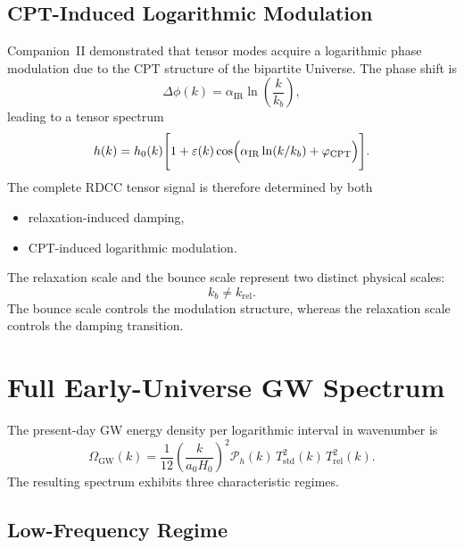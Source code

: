 \documentclass[11pt,a4paper]{article}
\begin{document}
\subsection{CPT-Induced Logarithmic Modulation}

Companion~II demonstrated that tensor modes acquire a logarithmic phase
modulation due to the CPT structure of the bipartite Universe. The phase
shift is
\begin{equation}
  \Delta\phi(k)
  =
  \alpha_{\mathrm{IR}}
  \ln
  \left(
    \frac{k}{k_{b}}
  \right),
\end{equation}
leading to a tensor spectrum
\begin{equation}
  h(k)
  =
  h_{0}(k)
  \Biggl[
    1
    +
    \varepsilon(k)
    \cos
    \Bigl(
      \alpha_{\mathrm{IR}}
      \ln(k/k_{b})
      +
      \varphi_{\mathrm{CPT}}
    \Bigr)
  \Biggr].
\end{equation}
The complete RDCC tensor signal is therefore determined by both
\begin{itemize}
  \item relaxation-induced damping,
  \item CPT-induced logarithmic modulation.
\end{itemize}
The relaxation scale and the bounce scale represent two distinct physical
scales:
\begin{equation}
  k_{b} \neq k_{\mathrm{rel}}.
\end{equation}
The bounce scale controls the modulation structure, whereas the relaxation
scale controls the damping transition.

\section{Full Early-Universe GW Spectrum}

The present-day GW energy density per logarithmic interval in wavenumber
is
\begin{equation}
  \Omega_{\mathrm{GW}}(k)
  =
  \frac{1}{12}
  \left(
    \frac{k}{a_{0} H_{0}}
  \right)^{2}
  \mathcal{P}_{h}(k)\,
  T_{\mathrm{std}}^{2}(k)\,
  T_{\mathrm{rel}}^{2}(k).
\end{equation}
The resulting spectrum exhibits three characteristic regimes.

\subsection{Low-Frequency Regime}
\end{document}
